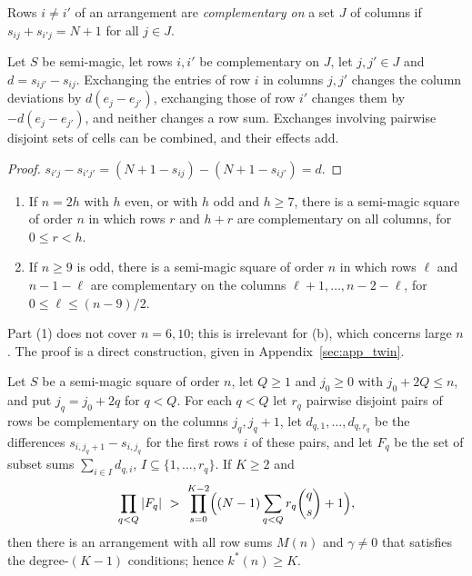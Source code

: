 \begin{definition}
Rows $i\ne i'$ of an arrangement are \emph{complementary on} a set $J$ of columns if $s_{ij}+s_{i'j}=N+1$ for all $j\in J$.
\end{definition}

\begin{lemma}
\label{lem:twin}
Let $S$ be semi-magic, let rows $i,i'$ be complementary on $J$, let $j,j'\in J$ and $d=s_{ij'}-s_{ij}$.
Exchanging the entries of row $i$ in columns $j,j'$ changes the column deviations by $d(e_j-e_{j'})$, exchanging those of row $i'$ changes them by $-d(e_j-e_{j'})$, and neither changes a row sum.
Exchanges involving pairwise disjoint sets of cells can be combined, and their effects add.
\end{lemma}

\begin{proof}
$s_{i'j}-s_{i'j'}=(N+1-s_{ij})-(N+1-s_{ij'})=d$.
\end{proof}

\begin{lemma}
\label{lem:twin_squares}
\leavevmode
\begin{enumerate}
\item If $n=2h$ with $h$ even, or with $h$ odd and $h\ge7$, there is a semi-magic square of order $n$ in which rows $r$ and $h+r$ are complementary on all columns, for $0\le r<h$.
\item If $n\ge9$ is odd, there is a semi-magic square of order $n$ in which rows $\ell$ and $n-1-\ell$ are complementary on the columns $\ell+1,\dots,n-2-\ell$, for $0\le\ell\le(n-9)/2$.
\end{enumerate}
\end{lemma}

Part (1) does not cover $n=6,10$; this is irrelevant for (b), which concerns large $n$.
The proof is a direct construction, given in Appendix~\ref{sec:app_twin}.

\begin{proposition}
\label{prop:box}
Let $S$ be a semi-magic square of order $n$, let $Q\ge1$ and $j_0\ge0$ with $j_0+2Q\le n$, and put $j_q=j_0+2q$ for $q<Q$.
For each $q<Q$ let $r_q$ pairwise disjoint pairs of rows be complementary on the columns $j_q,j_q+1$, let $d_{q,1},\dots,d_{q,r_q}$ be the differences $s_{i,j_q+1}-s_{i,j_q}$ for the first rows $i$ of these pairs, and let $F_q$ be the set of subset sums $\sum_{i\in I}d_{q,i}$, $I\subseteq\{1,\dots,r_q\}$.
If $K\ge2$ and
\begin{equation}
\prod_{q<Q}|F_q|\ >\ \prod_{s=0}^{K-2}\Bigl((N-1)\sum_{q<Q}r_q\binom qs+1\Bigr),
\label{eq:box}
\end{equation}
then there is an arrangement with all row sums $M(n)$ and $\gamma\ne0$ that satisfies the degree-$(K-1)$ conditions; hence $k^*(n)\ge K$.
\end{proposition}


